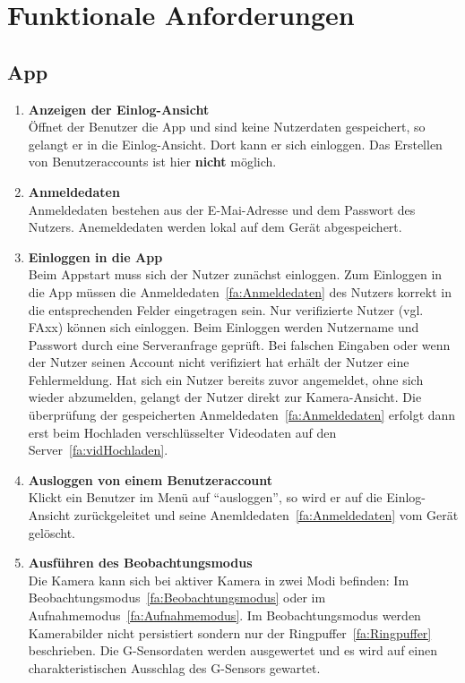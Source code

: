 \chapter{Funktionale Anforderungen}

\section{App}
\begin{enumerate}
\renewcommand{\labelenumi}{\textbf{\theenumi}}
\renewcommand{\theenumi}{FA\arabic{enumi}0}
\setcounter{enumi}{99}
\item \textbf{Anzeigen der Einlog-Ansicht} \hfill \\
Öffnet der Benutzer die App und sind keine Nutzerdaten gespeichert, so gelangt er in die Einlog-Ansicht. Dort kann er sich einloggen. Das Erstellen von Benutzeraccounts ist hier \textbf{nicht} möglich.

\item \label{fa:Anmeldedaten}\textbf{Anmeldedaten} \hfill \\
Anmeldedaten bestehen aus der E-Mai-Adresse und dem Passwort des Nutzers. Anemeldedaten werden lokal auf dem Gerät abgespeichert.

\item \textbf{Einloggen in die App} \hfill \\
Beim Appstart muss sich der Nutzer zunächst einloggen. Zum Einloggen in die App müssen die Anmeldedaten~\eqref{fa:Anmeldedaten} des Nutzers korrekt in die entsprechenden Felder eingetragen sein. Nur verifizierte Nutzer (vgl. FAxx) können sich einloggen. Beim Einloggen werden Nutzername und Passwort durch eine Serveranfrage geprüft. Bei falschen Eingaben oder wenn der Nutzer seinen Account nicht verifiziert hat erhält der Nutzer eine Fehlermeldung. Hat sich ein Nutzer bereits zuvor angemeldet, ohne sich wieder abzumelden, gelangt der Nutzer direkt zur Kamera-Ansicht. Die überprüfung der gespeicherten Anmeldedaten~\eqref{fa:Anmeldedaten} erfolgt dann erst beim Hochladen verschlüsselter Videodaten auf den Server~\eqref{fa:vidHochladen}.

\item \label{fa:logOut}\textbf{Ausloggen von einem Benutzeraccount} \hfill \\
Klickt ein Benutzer im Menü auf ``ausloggen'', so wird er auf die Einlog-Ansicht zurückgeleitet und seine Anemldedaten~\eqref{fa:Anmeldedaten} vom Gerät gelöscht.

\item \label{fa:Beobachtungsmodus}\textbf{Ausführen des Beobachtungsmodus} \hfill \\
Die Kamera kann sich bei aktiver Kamera in zwei Modi befinden: Im Beobachtungsmodus~\eqref{fa:Beobachtungsmodus} oder im Aufnahmemodus~\eqref{fa:Aufnahmemodus}.
Im Beobachtungsmodus werden Kamerabilder nicht persistiert sondern nur der Ringpuffer~\eqref{fa:Ringpuffer} beschrieben. Die G-Sensordaten werden ausgewertet und es wird auf einen charakteristischen Ausschlag des G-Sensors gewartet.


\end{enumerate}
